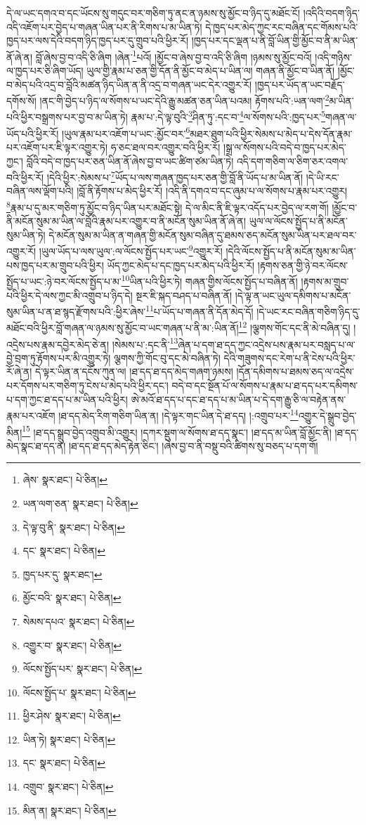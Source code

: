 དེ་ལ་ཡང་དགའ་བ་དང་ཡོངས་སུ་གདུང་བར་གཅིག་ཏུ་ནང་ན་ཉམས་སུ་མྱོང་བ་ཉིད་དུ་མཐོང་ངོ། །འདིའི་བདག་ཉིད་འདི་འཇོག་པར་བྱེད་པ་གཞན་ཡིན་པར་ནི་རིགས་པ་མ་ཡིན་ཏེ། དེ་ཁྱད་པར་མེད་ཀྱང་རང་བཞིན་དང་གོམས་པའི་ཁྱད་པར་ལས་དེའི་བདག་ཉིད་ཁྱད་པར་དུ་གྲུབ་པའི་ཕྱིར་རོ། །ཁྱད་པར་དང་ལྡན་པ་ནི་བློ་ཡིན་གྱི་མྱོང་བ་ནི་མ་ཡིན་ནོ་ཞེ་ན། བློ་ཞེས་བྱ་བ་འདི་ཅི་ཞིག །ཞེན་\footnote{ཞེས་  སྣར་ཐང་།  པེ་ཅིན། }པའོ། །མྱོང་བ་ཞེས་བྱ་བ་འདི་ཅི་ཞིག །ཉམས་སུ་མྱོང་བའོ། །འདི་གཉིས་ལ་ཁྱད་པར་ཅི་ཞིག་ཡོད། ཡུལ་གྱི་རྣམ་པ་ཅན་གྱི་དོན་ནི་མྱོང་བ་མེད་པ་ཡིན་ལ། གཞན་ནི་མྱོང་བ་ཡིན་ནོ། །མྱོང་བ་མེད་པའི་འདྲ་བ་བློའི་མཚན་ཉིད་ཡིན་ན་ནི་འདྲ་བ་གཞན་ཡང་དེར་འགྱུར་རོ། །ཁྱད་པར་ཡོད་ན་ཡང་བརྗོད་དགོས་སོ། །ནང་གི་བྱེད་པ་ཉིད་ལ་སོགས་པ་ཡང་དེའི་རྒྱུ་མཚན་ཅན་ཡིན་པའམ། རྟོགས་པའི་:ཡན་ལག་\footnote{ཡན་ལག་ཅན་  སྣར་ཐང་།  པེ་ཅིན། }མ་ཡིན་པའི་ཕྱིར་བསྒྲགས་པར་བྱ་བ་མ་ཡིན་ཏེ། རྣམ་པ་:དེ་ལྟ་བུའི་\footnote{དེ་ལྟ་བུ་ནི་  སྣར་ཐང་།  པེ་ཅིན། }ཤིན་ཏུ་:དང་བ་\footnote{དང་  སྣར་ཐང་།  པེ་ཅིན། }ལ་སོགས་པའི་:ཁྱད་པར་\footnote{ཁྱད་པར་དུ་  སྣར་ཐང་། }གཞན་ལ་ཡོད་པའི་ཕྱིར་རོ། །ཡུལ་རྣམ་པར་འཇོག་པ་ཡང་:མྱོང་བར་\footnote{མྱོང་བའི་  སྣར་ཐང་།  པེ་ཅིན། }མཐར་ཐུག་པའི་ཕྱིར་སེམས་པ་མེད་པ་དེས་དོན་རྣམ་པར་འཇོག་པར་ཇི་ལྟར་འགྱུར་ཏེ། ཧ་ཅང་ཐལ་བར་འགྱུར་བའི་ཕྱིར་རོ། །སྒྲ་ལ་སོགས་པའི་བདེ་བ་ཁྱད་པར་མེད་ཀྱང་། བློའི་བདེ་བ་ཁྱད་པར་ཅན་ཡིན་ནོ་ཞེས་བྱ་བ་ཡང་ཚིག་ཙམ་ཡིན་ཏེ། འདི་དག་གཅིག་ལ་ཅིག་ཅར་འགལ་བའི་ཕྱིར་རོ། །དེའི་ཕྱིར་:སེམས་པ་\footnote{སེམས་དཔའ་  སྣར་ཐང་།  པེ་ཅིན། }ཡོད་པ་ལས་གཞན་ཁྱད་པར་ཅན་གྱི་བློ་ནི་ཡོད་པ་མ་ཡིན་ནོ། །དེ་ཡི་རང་བཞིན་ལས་ལྡོག་པའི། །བློ་ནི་རྟོགས་པ་མེད་ཕྱིར་རོ། །འདི་ནི་དགའ་བ་དང་ཞུམ་པ་ལ་སོགས་པ་རྣམ་པར་འགྱུར། \footnote{འགྱུར་བ་  སྣར་ཐང་།  པེ་ཅིན། }རྣམ་པ་དུ་མར་གཅིག་ཏུ་མྱོང་བ་ཉིད་ཡིན་པར་མཐོང་སྟེ། དེ་ལ་མིང་ནི་ཇི་ལྟར་འདོད་པར་བྱེད་ལ་རག་གོ། །མྱོང་བ་ནི་མངོན་སུམ་མ་ཡིན་ལ་བློའི་རྣམ་པར་འགྱུར་བ་ནི་མངོན་སུམ་ཡིན་ནོ་ཞེ་ན། ཡུལ་ལ་ལོངས་སྤྱོད་པ་ནི་མངོན་སུམ་ཡིན་ཏེ། དེ་མངོན་སུམ་མ་ཡིན་ན་གཞན་གྱི་མངོན་སུམ་བཞིན་དུ་ཐམས་ཅད་མངོན་སུམ་ཡིན་པར་ཐལ་བར་འགྱུར་རོ། །ཡུལ་ཡོད་པ་ལས་ཡུལ་:ལ་ལོངས་སྤྱོད་པར་ཡང་\footnote{ལོངས་སྤྱོད་པར་  སྣར་ཐང་།  པེ་ཅིན། }འགྱུར་རོ། །དེའི་ལོངས་སྤྱོད་པ་ནི་མངོན་སུམ་མ་ཡིན་པས་ཁྱད་པར་མ་གྲུབ་པའི་ཕྱིར། ཡོད་ཀྱང་མེད་པ་དང་ཁྱད་པར་མེད་པའི་ཕྱིར་རོ། །རྟགས་ཅན་གྱི་ཉེ་བར་ལོངས་སྤྱོད་པ་ཡང་:ཉེ་བར་ལོངས་སྤྱོད་པ་མ་\footnote{ལོངས་སྤྱོད་པ་  སྣར་ཐང་།  པེ་ཅིན། }ཡིན་པའི་ཕྱིར་ཏེ། གཞན་གྱིས་ལོངས་སྤྱོད་པ་བཞིན་ནོ། །རྟགས་མ་གྲུབ་པའི་ཕྱིར་དེ་ལས་ཀྱང་མི་འགྲུབ་པ་ཉིད་དེ། སྔར་ཇི་སྐད་བཤད་པ་བཞིན་ནོ། །དེ་ལྟ་ན་ཡང་ཡུལ་དམིགས་པ་མངོན་སུམ་ཡིན་པ་ན་ཐ་སྙད་རྫོགས་པའི་:ཕྱིར་ཞེས་\footnote{ཕྱིར་ཤེས་  སྣར་ཐང་།  པེ་ཅིན། }པ་ཡོད་པ་གཞན་ནི་དོན་མེད་དོ། །དེ་ཡང་རང་བཞིན་གཅིག་ཉིད་དུ་མཐོང་བའི་ཕྱིར་བློ་གཞན་ལ་ཉམས་སུ་མྱོང་བ་ཡང་གཞན་པ་ནི་མ་:ཡིན་ནོ།\footnote{ཡིན་ཏེ།  སྣར་ཐང་།  པེ་ཅིན། } །ལྕགས་གོང་དང་ནི་མེ་བཞིན་དུ། །འདྲེས་པས་རྣམ་དབྱེར་མེད་ཅེ་ན། །སེམས་པ་:དང་ནི་\footnote{དང་  སྣར་ཐང་།  པེ་ཅིན། }ཞེན་པ་དག་ཐ་དད་ཀྱང་འདྲེས་པས་རྣམ་པར་བསླད་པ་ལ་བྱེ་བྲག་ཏུ་རྟོགས་པར་མི་འགྱུར་ཏེ། ལྕགས་ཀྱི་གོང་བུ་དང་མེ་བཞིན་ཏེ། དེའི་གཟུགས་དང་རེག་པ་ནི་ངེས་པའི་ཕྱིར་རོ་ཞེ་ན། དེ་ལྟར་ཡིན་ན་དངོས་ཀུན་ལ། །ཐ་དད་ཐ་དད་མེད་གཞག་ཉམས། །དོན་དམིགས་པ་ཐམས་ཅད་ལ་འདྲེས་པར་དོགས་པར་གཅིག་ཏུ་ངེས་པ་མེད་པའི་ཕྱིར་དང་། བདེ་བ་དང་སྔོན་པོ་ལ་སོགས་པ་རྣམ་པ་ཐ་དད་པར་དམིགས་པ་དག་ཀྱང་ཐ་དད་པ་མ་ཡིན་པའི་ཕྱིར། ཨེ་མའོ་ཐ་དད་པ་དང་ཐ་དད་པ་མ་ཡིན་པ་དེ་དག་རྒྱུ་ཅི་ལ་བརྟེན་ནས་རྣམ་པར་འཇོག །ཐ་དད་མེད་རིག་གཅིག་ཡིན་ན། །དེ་ལྟར་གང་ཡིན་དེ་ཐ་དད། །:འགྲུབ་པར་\footnote{འགྲུབ་  སྣར་ཐང་།  པེ་ཅིན། }འགྱུར་དེ་སྒྲུབ་བྱེད་མིན།\footnote{མིན་ན།  སྣར་ཐང་།  པེ་ཅིན། } །ཐ་དད་སྒྲུབ་བྱེད་འགྲུབ་མི་འགྱུར། །དཀར་སྡུག་ལ་སོགས་ཐ་དད་སྣང་། །ཐ་དད་མ་ཡིན་བློ་མྱོང་ནི། །ཐ་དད་མེད་སྣང་ཐ་དད་ན། །ཐ་དད་ཐ་དད་མེད་རྟེན་ཅིང་། །ཞེས་བྱ་བ་ནི་བསྡུ་བའི་ཚིགས་སུ་བཅད་པ་དག་གོ། 